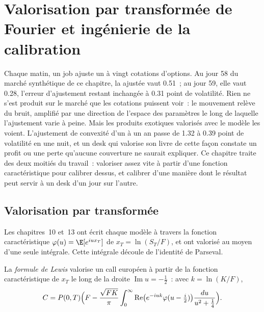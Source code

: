 \chapter{Valorisation par transformée de Fourier et ingénierie de la calibration}\label{ch:dv:fourier-pricing-and-calibration-engineering}

Chaque matin, un job ajuste un  à vingt cotations d'options. Au jour 58 du marché synthétique de ce chapitre, la  ajustée vaut 0.51~; au jour 59, elle vaut 0.28, l'erreur d'ajustement restant inchangée à 0.31 point de volatilité. Rien ne s'est produit sur le marché que les
cotations puissent voir~: le mouvement relève du bruit, amplifié par une direction de l'espace des paramètres le long de laquelle l'ajustement varie à peine. Mais les produits exotiques valorisés
avec le modèle les voient. L'ajustement de convexité d'un  à un an passe de 1.32 à 0.39 point de volatilité en une nuit, et un
desk qui valorise son livre de cette façon constate un profit ou une perte qu'aucune couverture ne saurait expliquer. Ce chapitre traite des deux moitiés du travail~: valoriser
assez vite à partir d'une fonction caractéristique pour calibrer dessus, et calibrer d'une manière dont le résultat peut servir à un desk d'un
jour sur l'autre.

\section{Valorisation par transformée}

Les chapitres~10 et~13 ont écrit chaque modèle à travers la fonction caractéristique $\varphi(u)=\E[e^{iux_T}]$ de $x_T=\ln(S_T/F)$, et ont
valorisé au moyen d'une seule intégrale. Cette intégrale découle de l'identité de Parseval.

\begin{definition}\label{def:dv:fourier-pricing-and-calibration-engineering:lewis}
La \emph{formule de Lewis} valorise un call européen à partir de la fonction caractéristique de $x_T$ le long de la
droite $\operatorname{Im}u=-\frac12$~: avec $k=\ln(K/F)$,
\[
C=P(0,T)\Bigl(F-\frac{\sqrt{FK}}{\pi}\int_0^\infty\operatorname{Re}\bigl(e^{-iuk}\varphi(u-\tfrac i2)\bigr)\frac{du}{u^2+\frac14}\Bigr).
\]
\end{definition}

